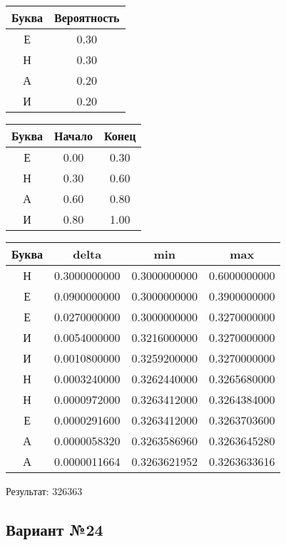 \documentclass[a4paper, 12pt]{article}
\begin{document}
\begin{center}
 \begin{tabular}{ |c|c| } 
  \hline
     Буква & Вероятность \\ \hline
Е & 0.30\\\hline
Н & 0.30\\\hline
А & 0.20\\\hline
И & 0.20
\\ \hline \end{tabular}
\end{center}
\begin{center}
 \begin{tabular}{ |c|c|c| } 
  \hline
     Буква & Начало & Конец \\ \hline
Е & 0.00 & 0.30\\\hline
Н & 0.30 & 0.60\\\hline
А & 0.60 & 0.80\\\hline
И & 0.80 & 1.00
\\ \hline \end{tabular}
\end{center}
\begin{center}
 \begin{tabular}{ |c|c|c|c| } 
  \hline
     Буква & delta & min & max \\ \hline
Н & 0.3000000000 & 0.3000000000 & 0.6000000000\\\hline
Е & 0.0900000000 & 0.3000000000 & 0.3900000000\\\hline
Е & 0.0270000000 & 0.3000000000 & 0.3270000000\\\hline
И & 0.0054000000 & 0.3216000000 & 0.3270000000\\\hline
И & 0.0010800000 & 0.3259200000 & 0.3270000000\\\hline
Н & 0.0003240000 & 0.3262440000 & 0.3265680000\\\hline
Н & 0.0000972000 & 0.3263412000 & 0.3264384000\\\hline
Е & 0.0000291600 & 0.3263412000 & 0.3263703600\\\hline
А & 0.0000058320 & 0.3263586960 & 0.3263645280\\\hline
А & 0.0000011664 & 0.3263621952 & 0.3263633616
\\ \hline \end{tabular}
\end{center}
Результат: 326363
\pagebreak
\subsection{Вариант №24}
\end{document}
